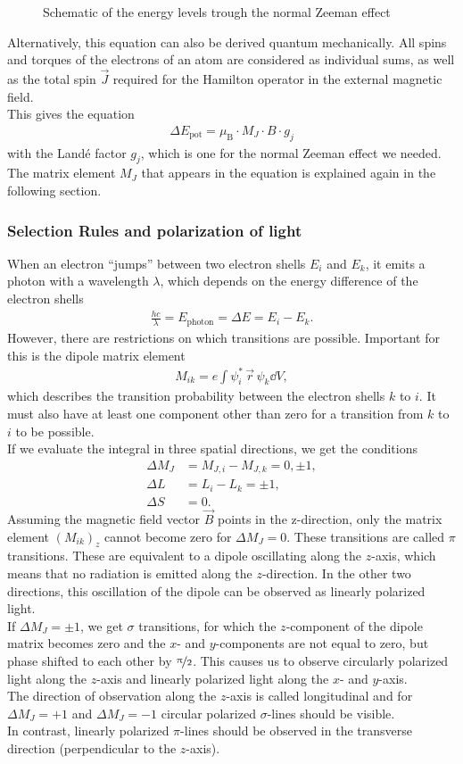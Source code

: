 \begin{figure}[ht]
\centering

\caption{Schematic of the energy levels trough the normal Zeeman effect}
\label{fig:splitting}
\end{figure}

Alternatively, this equation can also be derived quantum mechanically.
All spins and torques of the electrons of an atom are considered as individual sums, as well as the total spin $\vec{J}$ required for the Hamilton operator in the external magnetic field.\\
This gives the equation
\begin{align}
\Delta E_\text{pot} = \mu_\text{B} \cdot M_J \cdot B \cdot g_j
\end{align}
with the Landé factor $g_j$, which is one for the normal Zeeman effect we needed.
The matrix element $M_J$ that appears in the equation is explained again in the following section.

\subsubsection{Selection Rules and polarization of light}
When an electron \enquote{jumps} between two electron shells $E_i$ and $E_k$, it emits a photon with a wavelength $\lambda$, which depends on the energy difference of the electron shells
\begin{align}
\frac{hc}{\lambda} = E_\text{photon} = \Delta E = E_i - E_k.
\end{align}
However, there are restrictions on which transitions are possible.
Important for this is the dipole matrix element
\begin{align}
M_{ik} = e \int \psi_i^* \, \vec{r} \, \psi_k \dd{V},
\end{align}
which describes the transition probability between the electron shells $k$ to $i$.
It must also have at least one component other than zero for a transition from $k$ to $i$ to be possible.\\
If we evaluate the integral in three spatial directions, we get the conditions
\begin{align}
\Delta M_J &= M_{J,i} - M_{J,k} = 0, \pm 1,\\
\Delta L &= L_i - L_k = \pm 1,\\
\Delta S &= 0.
\end{align}
Assuming the magnetic field vector $\vec{B}$ points in the z-direction, only the matrix element $(M_{ik})_z$ cannot become zero for $\Delta M_J = 0$.
These transitions are called $\pi$ transitions.
These are equivalent to a dipole oscillating along the $z$-axis, which means that no radiation is emitted along the $z$-direction. In the other two directions, this oscillation of the dipole can be observed as linearly polarized light.\\
If $\Delta M_J = \pm 1$, we get $\sigma$ transitions, for which the $z$-component of the dipole matrix becomes zero and the $x$- and $y$-components are not equal to zero, but phase shifted to each other by $\nicefrac{\pi}{2}$.
This causes us to observe circularly polarized light along the $z$-axis and linearly polarized light along the $x$- and $y$-axis.\\

The direction of observation along the $z$-axis is called longitudinal and for $\Delta M_J = + 1$ and $\Delta M_J = - 1$ circular polarized $\sigma$-lines should be visible.\\
In contrast, linearly polarized $\pi$-lines should be observed in the transverse direction (perpendicular to the $z$-axis).